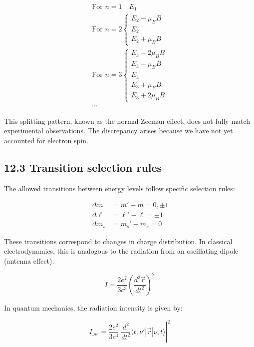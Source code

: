 \documentclass[10pt]{article}
\begin{document}
\begin{gather*}
\text{For } n=1 \quad E_1 \\
\text{For } n=2\left\{\begin{array}{l}
E_2-\mu_B B \\
E_2 \\
E_2+\mu_B B
\end{array}\right. \\
\text{For } n=3\left\{\begin{array}{l}
E_3-2\mu_B B \\
E_3-\mu_B B \\
E_3 \\
E_3+\mu_B B \\
E_3+2\mu_B B
\end{array}\right. \tag{12.26}\\
\cdots
\end{gather*}

This splitting pattern, known as the normal Zeeman effect, does not fully match experimental observations. The discrepancy arises because we have not yet accounted for electron spin.

\subsection*{12.3 Transition selection rules}
The allowed transitions between energy levels follow specific selection rules:

\begin{align*}
\Delta m &= m'-m=0,\pm 1 \\
\Delta\ell &= \ell'-\ell=\pm 1 \tag{12.27}\\
\Delta m_s &= m_s'-m_s=0
\end{align*}

These transitions correspond to changes in charge distribution. In classical electrodynamics, this is analogous to the radiation from an oscillating dipole (antenna effect):

\begin{equation*}
I=\frac{2e^2}{3c^3}\left(\frac{d^2\vec{r}}{dt^2}\right)^2 \tag{12.28}
\end{equation*}


In quantum mechanics, the radiation intensity is given by:

\begin{equation*}
I_{\nu\nu'}=\frac{2e^2}{3c^3}\left|\frac{d^2}{dt^2}\langle t,\nu'|\vec{r}|\nu,t\rangle\right|^2 \tag{12.29}
\end{equation*}
\end{document}
